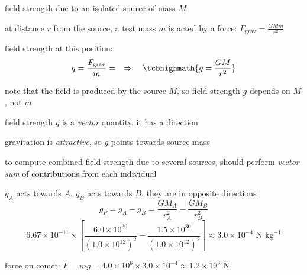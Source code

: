 \cmt field strength due to an isolated source of mass $M$

at distance $r$ from the source, a test mass $m$ is acted by a force: $F_\text{grav} = \frac{GMm}{r^2}$

field strength at this position: $$g = \frac{F_\text{grav}}{m} = \RA \tcbhighmath{g=\frac{GM}{r^2}}$$

note that the field is produced by the source $M$, so field strength $g$ depends on $M$, not $m$

\cmt field strength $g$ is a \emph{vector} quantity, it has a direction

gravitation is \emph{attractive}, so $g$ points towards source mass

to compute combined field strength due to several sources, should perform \emph{vector sum} of contributions from each individual



\begin{center}
\end{center}

\begin{soln}
     $g_A$ acts towards $A$, $g_B$ acts towards $B$, they are in opposite directions
\begin{equation*}
	g_P = g_A - g_B = \frac{GM_A}{r_A^2} - \frac{GM_B}{r_B^2}\end{equation*} \begin{equation*}
	     6.67\times10^{-11} \times\left[ \frac{6.0\times10^{30}}{(1.0\times10^{12})^2} - \frac{1.5\times10^{30}}{(1.0\times10^{12})^2}\right] \approx 3.0\times10^{-4} \text{ N kg}^{-1}
\end{equation*}

force on comet: $F=mg = 4.0\times10^6 \times 3.0\times10^{-4} \approx 1.2\times10^3 \text{ N}$ \end{soln}

